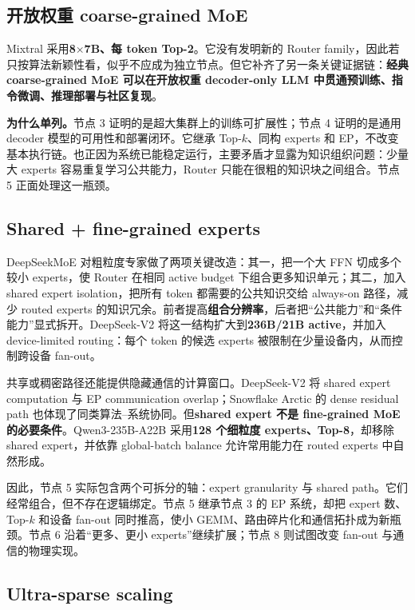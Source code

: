 \documentclass[10pt,a4paper,fontset=none]{ctexart}
\newcommand{\term}[1]{\textbf{#1}}
\begin{document}
\subsection{开放权重 coarse-grained MoE}

Mixtral 采用\textbf{8$\times$7B、每 token Top-2}\cite{zh:jiang2024mixtral}。它没有发明新的 Router family，因此若只按算法新颖性看，似乎不应成为独立节点。但它补齐了另一条关键证据链：\term{经典 coarse-grained MoE 可以在开放权重 decoder-only LLM 中贯通预训练、指令微调、推理部署与社区复现}。

\textbf{为什么单列。}节点 3 证明的是超大集群上的训练可扩展性；节点 4 证明的是通用 decoder 模型的可用性和部署闭环。它继承 Top-$k$、同构 experts 和 EP，不改变基本执行链。也正因为系统已能稳定运行，主要矛盾才显露为知识组织问题：少量大 experts 容易重复学习公共能力，Router 只能在很粗的知识块之间组合。节点 5 正面处理这一瓶颈。

\subsection{Shared + fine-grained experts}

DeepSeekMoE 对粗粒度专家做了两项关键改造\cite{zh:dai2024deepseekmoe}：其一，把一个大 FFN 切成多个较小 experts，使 Router 在相同 active budget 下组合更多知识单元；其二，加入 shared expert isolation，把所有 token 都需要的公共知识交给 always-on 路径，减少 routed experts 的知识冗余。前者提高\term{组合分辨率}，后者把“公共能力”和“条件能力”显式拆开。DeepSeek-V2 将这一结构扩大到\textbf{236B/21B active}，并加入 device-limited routing：每个 token 的候选 experts 被限制在少量设备内，从而控制跨设备 fan-out\cite{zh:deepseekv2}。

共享或稠密路径还能提供隐藏通信的计算窗口。DeepSeek-V2 将 shared expert computation 与 EP communication overlap；Snowflake Arctic 的 dense residual path 也体现了同类算法--系统协同\cite{zh:snowflakearctic}。但\term{shared expert 不是 fine-grained MoE 的必要条件}。Qwen3-235B-A22B 采用\textbf{128 个细粒度 experts、Top-8}，却移除 shared expert，并依靠 global-batch balance 允许常用能力在 routed experts 中自然形成\cite{zh:qwen3}。

因此，节点 5 实际包含两个可拆分的轴：expert granularity 与 shared path。它们经常组合，但不存在逻辑绑定。节点 5 继承节点 3 的 EP 系统，却把 expert 数、Top-$k$ 和设备 fan-out 同时推高，使小 GEMM、路由碎片化和通信拓扑成为新瓶颈。节点 6 沿着“更多、更小 experts”继续扩展；节点 8 则试图改变 fan-out 与通信的物理实现。

\subsection{Ultra-sparse scaling}
\end{document}
